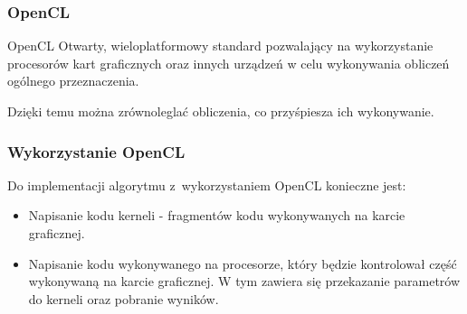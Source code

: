 \begin{frame}
\frametitle{OpenCL}
\begin{block}{OpenCL}
Otwarty, wieloplatformowy standard pozwalający na wykorzystanie procesorów kart graficznych oraz innych urządzeń w celu wykonywania obliczeń ogólnego przeznaczenia.
\end{block}

Dzięki temu można zrównoleglać obliczenia, co przyśpiesza ich wykonywanie.

\end{frame}


\begin{frame}
\frametitle{Wykorzystanie OpenCL}

Do implementacji algorytmu z~wykorzystaniem OpenCL konieczne jest:
\begin{itemize}
\item Napisanie kodu kerneli - fragmentów kodu wykonywanych na karcie graficznej.
\item Napisanie kodu wykonywanego na procesorze, który będzie kontrolował część wykonywaną na karcie graficznej. W tym zawiera się przekazanie parametrów do kerneli oraz pobranie wyników.
\end{itemize}

\end{frame}


